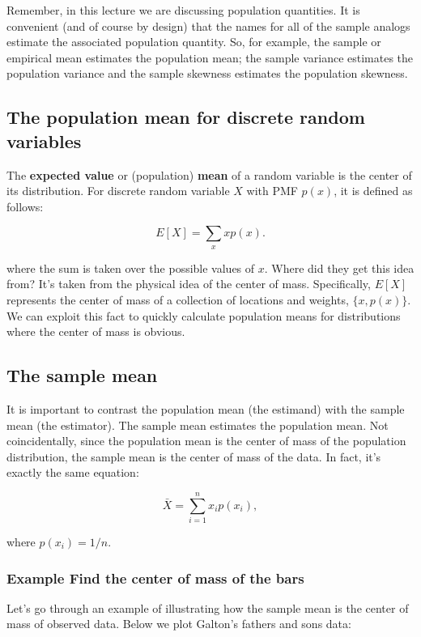 \documentclass[]{article}
\begin{document}
Remember, in this lecture we are discussing population quantities. It is
convenient (and of course by design) that the names for all of the
sample analogs estimate the associated population quantity. So, for
example, the sample or empirical mean estimates the population mean; the
sample variance estimates the population variance and the sample
skewness estimates the population skewness.

\subsection{The population mean for discrete random
variables}\label{the-population-mean-for-discrete-random-variables}

The \textbf{expected value} or (population) \textbf{mean} of a random
variable is the center of its distribution. For discrete random variable
$X$ with PMF $p(x)$, it is defined as follows:

\[
E[X] = \sum_x xp(x).
\]

where the sum is taken over the possible values of $x$. Where did they
get this idea from? It's taken from the physical idea of the center of
mass. Specifically, $E[X]$ represents the center of mass of a collection
of locations and weights, $\{x, p(x)\}$. We can exploit this fact to
quickly calculate population means for distributions where the center of
mass is obvious.

\subsection{The sample mean}\label{the-sample-mean}

It is important to contrast the population mean (the estimand) with the
sample mean (the estimator). The sample mean estimates the population
mean. Not coincidentally, since the population mean is the center of
mass of the population distribution, the sample mean is the center of
mass of the data. In fact, it's exactly the same equation:

\[
\bar X = \sum_{i=1}^n x_i p(x_i),
\]

where $p(x_i) = 1/n$.

\subsubsection{Example Find the center of mass of the
bars}\label{example-find-the-center-of-mass-of-the-bars}

Let's go through an example of illustrating how the sample mean is the
center of mass of observed data. Below we plot Galton's fathers and sons
data:
\end{document}
